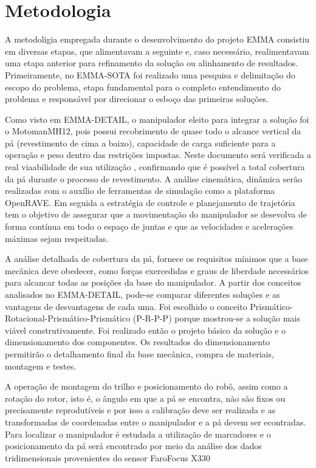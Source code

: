 \section{Metodologia}


A metodoligia empregada durante o desenvolvimento do projeto EMMA consistiu em
diversas etapas, que alimentavam a seguinte e, caso necessário,
realimentavam uma etapa anterior para refinamento da solução ou alinhamento de
resultados. Primeiramente, no EMMA-SOTA foi realizado uma pesquisa e delimitação
do escopo do problema, etapa fundamental para o completo entendimento do problema e
responsável por direcionar o esboço das primeiras soluções. 

Como visto em EMMA-DETAIL, o manipulador eleito para integrar a solução foi o
Motoman\textregistered MH12, pois possui
recobrimento de quase todo o alcance vertical da pá (revestimento de cima a
baixo), capacidade de carga suficiente para a operação e peso dentro das
restrições impostas. Neste documento será verificada a real viaabilidade de
sua utilização , confirmando que é possível a total cobertura da pá durante o
processo de revestimento. A análise cinemática, dinâmica serão realizadas com o auxílio de
ferramentas de simulação como a plataforma OpenRAVE. Em seguida a estratégia de
controle e planejamento de trajetória tem o objetivo de assegurar que a
movimentação do manipulador se desevolva de forma contínua em todo o espaço de juntas e que as velocidades e
acelerações máximas sejam respeitadas.

A análise detalhada de cobertura da pá, fornece os requisitos mínimos que a base
mecânica deve obedecer, como forças exercedidas e graus de liberdade necessários
para alcancar todas as posições da base do manipulador. A partir dos conceitos
analisados no EMMA-DETAIL, pode-se comparar diferentes soluções e as vantagens
de desvantagens de cada uma. Foi escolhido o conceito
Prismático-Rotacional-Prismático-Prismático (P-R-P-P) porque mostrou-se a
solução mais viável construtivamente. Foi realizado então o projeto básico da
solução e o dimensionamento dos componentes. Os resultados do dimensionamento
permitirão o detalhamento final da base mecânica, compra de materiais, montagem
e testes.

A operação de montagem do trilho e posicionamento do robô, assim como
a rotação do rotor, isto é, o ângulo em que a pá se encontra, não são fixos ou
precisamente reprodutíveis e por isso a calibração deve ser realizada e as
transformadas de coordenadas entre o manipulador e a pá devem ser econtradas.
Para localizar o manipulador é estudada a utilização de marcadores e o
posicionamento da pá será encontrado por meio da análise dos dados
tridimensionais provenientes do sensor Faro\textregistered Focus X330
